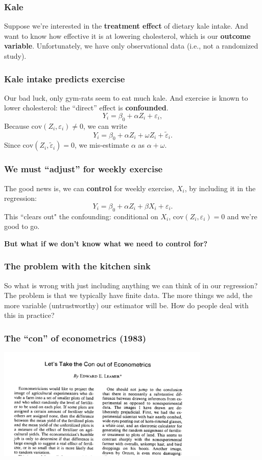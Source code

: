 \documentclass{beamer}
\newcommand{\sk}{\vspace{.5cm}}
\begin{document}
\begin{frame}
\frametitle{Kale}

\sk
Suppose we're interested in the {\bf treatment effect} of dietary kale intake.  
\vfill
And want to know how effective it is at lowering cholesterol, which is our {\bf outcome variable}. 
\vfill
Unfortunately, we have only observational data (i.e., not a randomized study).
\vfill
\end{frame}

\begin{frame}
\frametitle{Kale intake predicts exercise}
Our bad luck, only gym-rats seem to eat much kale.  And exercise is known to lower cholesterol: the ``direct'' effect is {\bf confounded}.
\vfill
$$Y_i = \beta_0 + \alpha Z_i + \varepsilon_i,$$ 
\vfill
Because $\mbox{cov}(Z_i, \varepsilon_i) \neq 0$, we can write 
\vfill
$$Y_i = \beta_0 + \alpha Z_i + \omega Z_i + \tilde{\varepsilon}_i.$$ 
\vfill
Since $\mbox{cov}(Z_i, \tilde{\varepsilon}_i) = 0$, we mis-estimate $\alpha$ as $\alpha + \omega$.
\vfill
\end{frame}


\begin{frame}
\frametitle{We must ``adjust'' for weekly exercise}
The good news is, we can {\bf control} for weekly exercise, $X_i$, by including it in the regression:
\vfill 
$$Y_i = \beta_0 + \alpha Z_i + \beta X_i + \varepsilon_i.$$ 
\vfill
This ``clears out" the confounding: conditional on $X_i$, $\mbox{cov}(Z_i, \varepsilon_i) = 0$ and we're good to go.
\vfill
\begin{center}
{\bf But what if we don't know what we need to control for?}
\end{center}
\vfill
\end{frame}

\begin{frame}
\frametitle{The problem with the kitchen sink}

\sk
So what is wrong with just including anything we can think of in our regression?
\vfill
The problem is that we typically have finite data. The more things we add, the more variable (untrustworthy) our estimator will be.
\vfill
How do people deal with this in practice?
\vfill
\end{frame}

\begin{frame}
\frametitle{The ``con'' of econometrics (1983)}
\begin{center}
\includegraphics[width=4in]{figures/leamer.png}
\end{center}

\end{frame}
\end{document}
